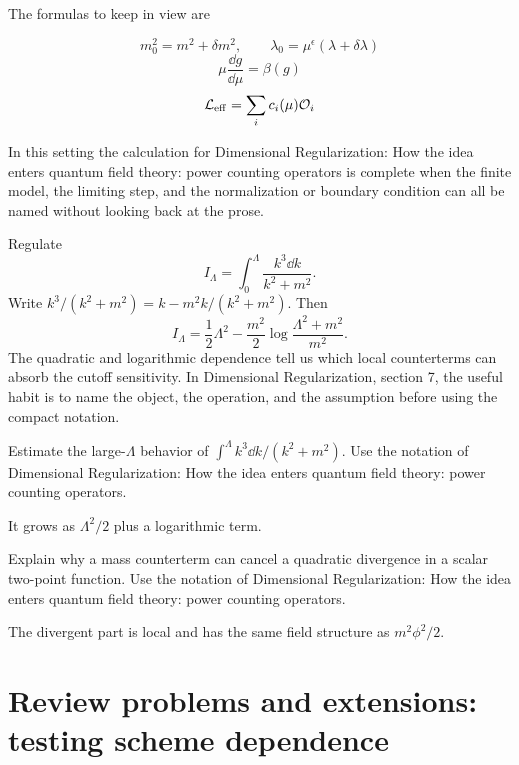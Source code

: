 The formulas to keep in view are

\[
  m_0^2=m^2+\delta m^2,\qquad \lambda_0=\mu^\epsilon(\lambda+\delta\lambda)
\]
\[
  \mu\frac{\dd g}{\dd\mu}=\beta(g)
\]
\[
  \mathcal L_{\mathrm{eff}}=\sum_i c_i(\mu)\mathcal O_i
\]

In this setting the calculation for Dimensional Regularization: How the idea enters quantum field theory: power counting operators is complete when the finite model, the limiting step, and the normalization or boundary condition can all be named without looking back at the prose.




\begin{example}
Regulate
\[
  I_\Lambda=\int_0^\Lambda\frac{k^3\dd k}{k^2+m^2}.
\]
Write \(k^3/(k^2+m^2)=k-m^2k/(k^2+m^2)\).  Then
\[
  I_\Lambda=\frac12\Lambda^2-\frac{m^2}{2}\log\frac{\Lambda^2+m^2}{m^2}.
\]
The quadratic and logarithmic dependence tell us which local counterterms can absorb the cutoff sensitivity.  In Dimensional Regularization, section 7, the useful habit is to name the object, the operation, and the assumption before using the compact notation.
\end{example}



\begin{exercise}
Estimate the large-\(\Lambda\) behavior of \(\int^\Lambda k^3\dd k/(k^2+m^2)\).  Use the notation of Dimensional Regularization: How the idea enters quantum field theory: power counting operators.
\begin{answer}
It grows as \(\Lambda^2/2\) plus a logarithmic term.
\end{answer}
\end{exercise}

\begin{exercise}
Explain why a mass counterterm can cancel a quadratic divergence in a scalar two-point function.  Use the notation of Dimensional Regularization: How the idea enters quantum field theory: power counting operators.
\begin{answer}
The divergent part is local and has the same field structure as \(m^2\phi^2/2\).
\end{answer}
\end{exercise}



\section{Review problems and extensions: testing scheme dependence}

